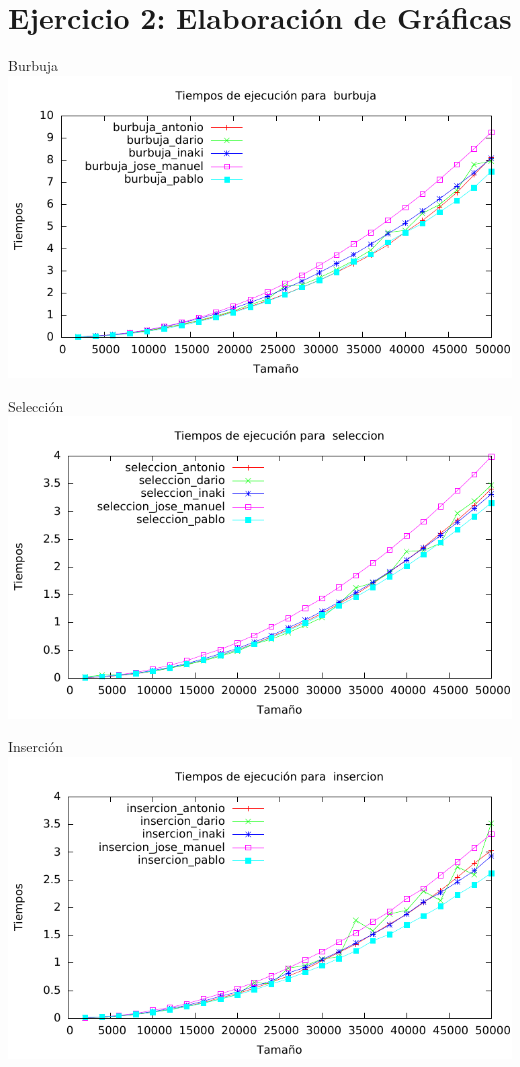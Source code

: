 \documentclass[10pt,compress,usetitleprogressbar,mathserif]{beamer}
\begin{document}
\section{Ejercicio 2: \large{Elaboración de Gráficas}}

\begin{frame}{Burbuja}
	\includegraphics[width = \textwidth ]{burbuja_todos_g}
\end{frame}

\begin{frame}{Selección}
	\includegraphics[width = \textwidth ]{seleccion_todos_g}
\end{frame}

\begin{frame}{Inserción}
	\includegraphics[width = \textwidth ]{insercion_todos_g}
\end{frame}
\end{document}

